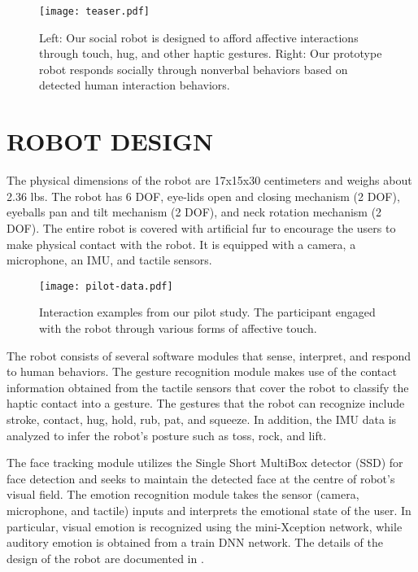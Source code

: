 \documentclass[letterpaper, 10 pt, conference]{ieeeconf}  %
\begin{document}
\begin{figure}[t!]
\centering
\texttt{[image: teaser.pdf]}
\vskip -10pt
\caption{Left: Our social robot is designed to afford affective interactions through touch, hug, and other haptic gestures. Right: Our prototype robot responds socially through nonverbal behaviors based on detected human interaction behaviors.}
\label{fig:teaser}
\end{figure}

\section{ROBOT DESIGN}
The physical dimensions of the robot are 17x15x30 centimeters and weighs about 2.36 lbs. The robot has 6 DOF, eye-lids open and closing mechanism (2 DOF), eyeballs pan and tilt mechanism (2 DOF), and neck rotation mechanism (2 DOF). The entire robot is covered with artificial fur to encourage the users to make physical contact with the robot. It is equipped with a camera, a microphone, an IMU, and tactile sensors.  

\begin{figure*}[t!]
\centering
\texttt{[image: pilot-data.pdf]}
\vskip -10pt
\caption{Interaction examples from our pilot study. The participant engaged with the robot through various forms of affective touch.}
\label{fig:pilot-study}
\end{figure*}

The robot consists of several software modules that sense, interpret, and respond to human behaviors. The gesture recognition module makes use of the contact information obtained from the tactile sensors that cover the robot to classify the haptic contact into a gesture. The gestures that the robot can recognize include stroke, contact, hug, hold, rub, pat, and squeeze. In addition, the IMU data is analyzed to infer the robot's posture such as toss, rock, and lift.  

The face tracking module utilizes the Single Short MultiBox detector (SSD) for face detection and seeks to maintain the detected face at the centre of robot's visual field. The emotion recognition module takes the sensor (camera, microphone, and tactile) inputs and interprets the emotional state of the user. In particular, visual emotion is recognized using the mini-Xception network, while auditory emotion is obtained from a train DNN network. The details of the design of the robot are documented in \cite{r4}. 
\end{document}
